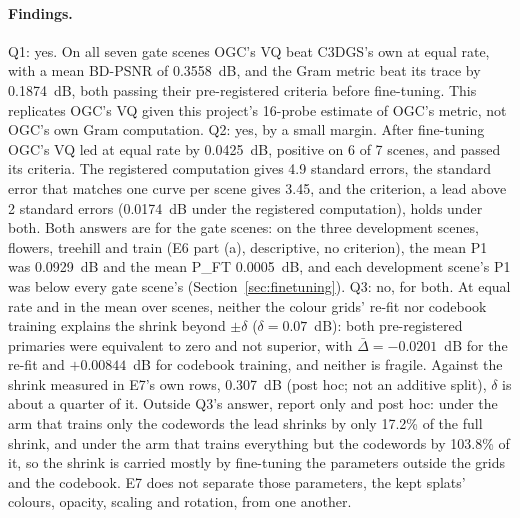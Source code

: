 \paragraph{Findings.}
Q1: yes. On all seven gate scenes OGC's VQ beat C3DGS's own at equal rate, with a mean BD-PSNR of 0.3558~dB, and the Gram metric beat its trace by 0.1874~dB, both passing their pre-registered criteria before fine-tuning. %
This replicates OGC's VQ given this project's 16-probe estimate of OGC's metric, not OGC's own Gram computation. %
Q2: yes, by a small margin. After fine-tuning OGC's VQ led at equal rate by 0.0425~dB, positive on 6 of 7 scenes, and passed its criteria. %
The registered computation gives 4.9 standard errors, the standard error that matches one curve per scene gives 3.45, and the criterion, a lead above 2 standard errors (0.0174~dB under the registered computation), holds under both. %
Both answers are for the gate scenes: on the three development scenes, flowers, treehill and train (E6 part (a), descriptive, no criterion), the mean P1 was 0.0929~dB and the mean P\_FT 0.0005~dB, and each development scene's P1 was below every gate scene's (Section~\ref{sec:finetuning}). %
Q3: no, for both. At equal rate and in the mean over scenes, neither the colour grids' re-fit nor codebook training explains the shrink beyond $\pm\delta$ ($\delta = 0.07$~dB): both pre-registered primaries were equivalent to zero and not superior, with $\bar\Delta = -0.0201$~dB for the re-fit and $+0.00844$~dB for codebook training, and neither is fragile. %
Against the shrink measured in E7's own rows, 0.307~dB (post hoc; not an additive split), $\delta$ is about a quarter of it. %
Outside Q3's answer, report only and post hoc: under the arm that trains only the codewords the lead shrinks by only 17.2\% of the full shrink, and under the arm that trains everything but the codewords by 103.8\% of it, so the shrink is carried mostly by fine-tuning the parameters outside the grids and the codebook. %
E7 does not separate those parameters, the kept splats' colours, opacity, scaling and rotation, from one another. %

